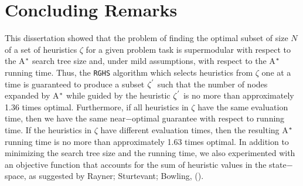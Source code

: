 
 
\chapter{Concluding Remarks}\label{ch:conclusions}

\iffalse
\chapterprecis{The purpose of this section is to introduce the meta-reasoning proposed.}\index{sinopse de capítulo}
\fi

\noindent
This dissertation showed that the problem of finding the optimal subset of size $N$ of a set of heuristics $\zeta$ for a given problem task is supermodular with respect to the A$\sp{*}$ search tree size and, under mild assumptions, with respect to the A$\sp{*}$ running time. Thus, the \texttt{RGHS} algorithm which selects heuristics from $\zeta$ one at a time is guaranteed to produce a subset $\zeta\sp{'}$ such that the number of nodes expanded by A$\sp{*}$ while guided by the heuristic $\zeta\sp{'}$ is no more than approximately 1.36 times optimal. Furthermore, if all heuristics in $\zeta$ have the same evaluation time, then we have the same near$-$optimal guarantee with respect to running time. If the heuristics in $\zeta$ have different evaluation times, then the resulting A$\sp{*}$ running time is no more than approximately 1.63 times optimal. In addition to minimizing the search tree size and the running time, we also experimented with an objective function that accounts for the sum of heuristic values in the state$-$space, as suggested by Rayner; Sturtevant; Bowling, (\citeyear{raynersss13}).\\

